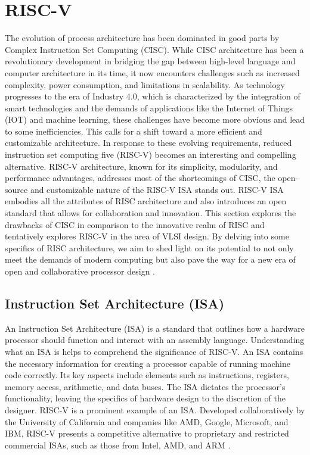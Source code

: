 \documentclass[conference]{IEEEtran}
\begin{document}
\section{RISC-V}
The evolution of process architecture has been dominated in good parts by Complex Instruction Set Computing (CISC). While CISC architecture has been a revolutionary development in bridging the gap between high-level language and computer architecture in its time, it now encounters challenges such as increased complexity, power consumption, and limitations in scalability.
As technology progresses to the era of Industry 4.0, which is characterized by the integration of smart technologies and the demands of applications like the Internet of Things (IOT) and machine learning, these challenges have become more obvious and lead to some inefficiencies. This calls for a shift toward a more efficient and customizable architecture. In response to these evolving requirements, reduced instruction set computing five (RISC-V) becomes an interesting and compelling alternative. RISC-V architecture, known for its simplicity, modularity, and performance advantages, addresses most of the shortcomings of CISC, the open-source and customizable nature of the RISC-V ISA stands out. RISC-V ISA embodies all the attributes of RISC architecture and also introduces an open standard that allows for collaboration and innovation. This section explores the drawbacks of CISC in comparison to the innovative realm of RISC and tentatively explores RISC-V in the area of VLSI design. By delving into some specifics of RISC architecture, we aim to shed light on its potential to not only meet the demands of modern computing but also pave the way for a new era of open and collaborative processor design \cite{15}.
\subsection{Instruction Set Architecture (ISA)}
An Instruction Set Architecture (ISA) is a standard that outlines how a hardware processor should function and interact with an assembly language. Understanding what an ISA is helps to comprehend the significance of RISC-V. An ISA contains the necessary information for creating a processor capable of running machine code correctly. Its key aspects include elements such as instructions, registers, memory access, arithmetic, and data buses. The ISA dictates the processor's functionality, leaving the specifics of hardware design to the discretion of the designer. RISC-V is a prominent example of an ISA. Developed collaboratively by the University of California and companies like AMD, Google, Microsoft, and IBM, RISC-V presents a competitive alternative to proprietary and restricted commercial ISAs, such as those from Intel, AMD, and ARM \cite{13}.
\end{document}
